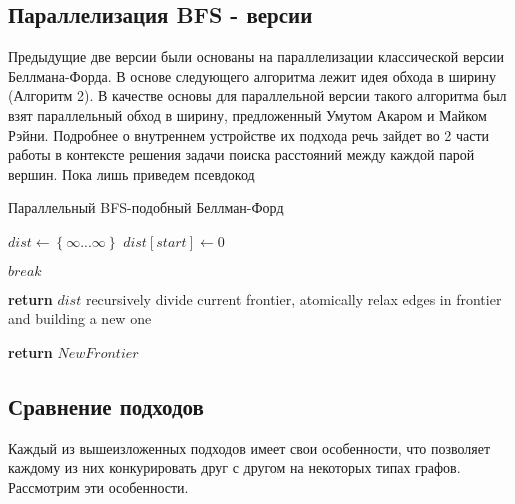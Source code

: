 \FloatBarrier
\subsection{Параллелизация BFS - версии}
Предыдущие две версии были основаны на параллелизации классической версии Беллмана-Форда. В основе следующего алгоритма лежит идея обхода в ширину (Алгоритм 2). В качестве основы для параллельной версии такого алгоритма был взят параллельный обход в ширину, предложенный Умутом Акаром и Майком Рэйни. Подробнее о внутреннем устройстве их подхода речь зайдет во 2 части работы в контексте решения задачи поиска расстояний между каждой парой вершин. Пока лишь приведем псевдокод 

\FloatBarrier
\begin{algorithm}
\caption{Параллельный BFS-подобный Беллман-Форд}\label{bf_bfs_par}
\begin{algorithmic}[1]
\State $dist\gets \left\{ {\infty ... \infty}\right\}$
\State $dist[start] \gets 0$

	  
	
		\State $break$						
	\EndIf
		
		
\EndFor
\State \textbf{return} $dist$
\EndProcedure
\State
{}
\State recursively divide current frontier, atomically relax edges in frontier and building a new one

\State \textbf{return} $NewFrontier$
\EndProcedure

\end{algorithmic}
\end{algorithm}


\FloatBarrier
\subsection{Сравнение подходов}
Каждый из вышеизложенных подходов имеет свои особенности, что позволяет каждому из них конкурировать друг с другом на некоторых типах графов. Рассмотрим эти особенности.

